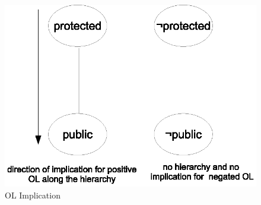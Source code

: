 
 	\begin{figure} 
 		\centering
 		\includegraphics[width=.4\textwidth]{ol-implication}
 		\caption{OL Implication}
 		\label{fig:ol-implication}
 	\end{figure}
